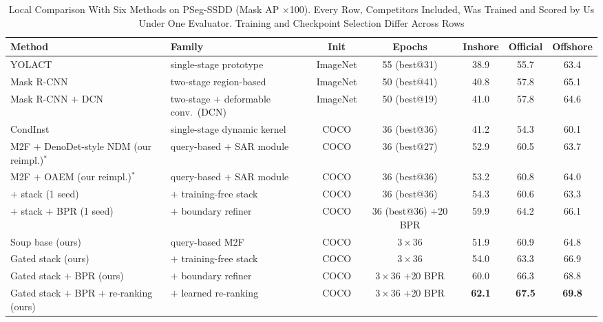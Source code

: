 \begin{table}[!t]
\caption{Local Comparison With Six Methods on PSeg-SSDD (Mask AP $\times$100). Every Row, Competitors Included, Was Trained and Scored by Us Under One Evaluator. Training and Checkpoint Selection Differ Across Rows}
\label{tab:ssdd_cmp}
\centering
\footnotesize
\setlength{\tabcolsep}{3pt}
\begin{tabular}{llccccc}
\toprule
Method & Family & Init & Epochs & Inshore & Official & Offshore \\
\midrule
YOLACT \cite{yolact2019} & single-stage prototype & ImageNet & 55 (best@31) & 38.9 & 55.7 & 63.4 \\
Mask R-CNN \cite{maskrcnn2017} & two-stage region-based & ImageNet & 50 (best@41) & 40.8 & 57.8 & 65.1 \\
Mask R-CNN $+$ DCN \cite{dcnv22018} & two-stage $+$ deformable conv.\ (DCN) & ImageNet & 50 (best@19) & 41.0 & 57.8 & 64.6 \\
CondInst \cite{condinst2020} & single-stage dynamic kernel & COCO & 36 (best@36) & 41.2 & 54.3 & 60.1 \\
M2F $+$ DenoDet-style NDM (our reimpl.)$^{\ast}$ \cite{denodetv22026} & query-based $+$ SAR module & COCO & 36 (best@27) & 52.9 & 60.5 & 63.7 \\
M2F $+$ OAEM (our reimpl.)$^{\ast}$ \cite{o2former2025} & query-based $+$ SAR module & COCO & 36 (best@36) & 53.2 & 60.8 & 64.0 \\
\quad $+$ stack (1 seed) & $+$ training-free stack & COCO & 36 (best@36) & 54.3 & 60.6 & 63.3 \\
\quad $+$ stack $+$ BPR (1 seed) & $+$ boundary refiner & COCO & 36 (best@36) $+$20 BPR & 59.9 & 64.2 & 66.1 \\
\midrule
Soup base (ours) & query-based M2F & COCO & $3\times36$ & 51.9 & 60.9 & 64.8 \\
Gated stack (ours) & $+$ training-free stack & COCO & $3\times36$ & 54.0 & 63.3 & 66.9 \\
Gated stack $+$ BPR (ours) & $+$ boundary refiner & COCO & $3\times36$ $+$20 BPR & 60.0 & 66.3 & 68.8 \\
Gated stack $+$ BPR $+$ re-ranking (ours) & $+$ learned re-ranking & COCO & $3\times36$ $+$20 BPR & \textbf{62.1} & \textbf{67.5} & \textbf{69.8} \\
\bottomrule
\end{tabular}
\par\vspace{2pt}

\end{table}
